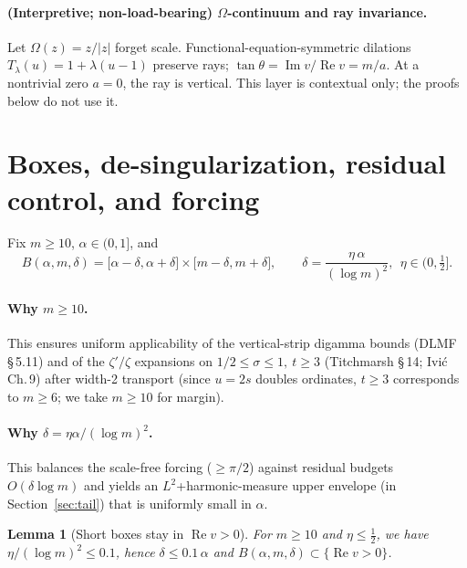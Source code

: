 \documentclass[11pt]{article}
\numberwithin{equation}{section}
\newtheorem{lemma}[theorem]{Lemma}
\theoremstyle{remark}
\DeclareMathOperator{\Imag}{Im}
\DeclareMathOperator{\Real}{Re}
\begin{document}
\paragraph{(Interpretive; non-load-bearing) $\Omega$-continuum and ray invariance.}
Let $\Omega(z)=z/|z|$ forget scale. Functional-equation-symmetric dilations $T_\lambda(u)=1+\lambda(u-1)$ preserve rays; $\tan\theta=\Imag v/\Real v=m/a$. At a nontrivial zero $a=0$, the ray is vertical. This layer is contextual only; the proofs below do not use it.

\section{Boxes, de-singularization, residual control, and forcing}\label{sec:boxes}

Fix $m\ge 10$, $\alpha\in(0,1]$, and
\begin{equation}\label{eq:box-delta}
B(\alpha,m,\delta)=\big[\alpha-\delta,\alpha+\delta\big]\times\big[m-\delta,m+\delta\big],
\qquad
\delta=\frac{\eta\,\alpha}{(\log m)^2},\ \ \eta\in(0,\tfrac12].
\end{equation}

\paragraph{Why $m\ge 10$.}
This ensures uniform applicability of the vertical-strip digamma bounds (DLMF §\,5.11) and of the $\zeta'/\zeta$ expansions on $1/2\le\sigma\le1,\ t\ge 3$ (Titchmarsh §\,14; Ivi\'c Ch.\,9) after width-2 transport (since $u=2s$ doubles ordinates, $t\ge3$ corresponds to $m\ge 6$; we take $m\ge10$ for margin).

\paragraph{Why $\delta=\eta\alpha/(\log m)^2$.}
This balances the scale-free forcing ($\ge\pi/2$) against residual budgets $O(\delta\log m)$ and yields an $L^2$+harmonic-measure upper envelope (in Section~\ref{sec:tail}) that is uniformly small in $\alpha$.

\begin{lemma}[Short boxes stay in $\Real v>0$]\label{lem:box-right}
For $m\ge10$ and $\eta\le\tfrac12$, we have $\eta/(\log m)^2\le 0.1$, hence $\delta\le 0.1\,\alpha$ and $B(\alpha,m,\delta)\subset\{\Real v>0\}$.
\end{lemma}
\end{document}
